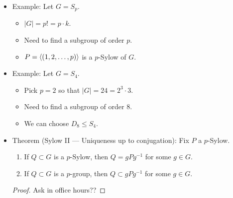 \documentclass[../notes.tex]{subfiles}
\begin{document}
\begin{itemize}
\begin{proof}
\begin{equation*}
            |\Orb(S)| = \frac{|G|}{|\Stab(S)|}
            = \frac{p^n\cdot k}{p^m\cdots}
            = p^{n-m}\cdots
        \end{equation*}
        i.e., that $|\Orb(S)|$ has at least one power of $p$ in its prime factorization. This implies that $|\Orb(S)|\equiv 0\mod p$. But since $|\Orb(S)|$ is divisible by $p$ for all $S$, $|X|$ must be, too (why??). However,
        \begin{equation*}
            |X| = \binom{p^nk}{p^n}
            = \frac{(p^nk)!}{(p^nk-p^n)!p^n!}
            = \frac{(p^nk)(p^nk-1)\cdots(p^nk-p^n+1)}{(p^n)(p^n-1)\cdots 1}
            = \frac{p^nk}{p^n}\cdots\frac{p^nk-(p^n-1)}{p^n-(p^n-1)}
        \end{equation*}
        We show that every power of $p$ in the numerator above cancels with one in the denominator. In fact, we can do this term-by-term. Consider $p^nk-i$ and $p^n-i$ for some $i=0,\dots,p^n-1$. Let $p^j$ be the largest power of $p$ dividing $i$. Note that since $i<p^n$, we must have $j<n$. Thus, $p^j$ will divide $p^nk$ and $p^n$, too, and hence the differences $p^nk-i$ and $p^n-i$ as well. This implies the desired result. Therefore, since there are no "excess" powers of $p$ in the numerator above, $|X|$ is \emph{not} divisible by $p$, a contradiction.
    \end{proof}
    \item Example: Let $G=S_p$.
    \begin{itemize}
        \item $|G|=p!=p\cdot k$.
        \item Need to find a subgroup of order $p$.
        \item $P=\left\langle{(1,2,\dots,p)}\right\rangle$ is a $p$-Sylow of $G$.
    \end{itemize}
    \item Example: Let $G=S_4$.
    \begin{itemize}
        \item Pick $p=2$ so that $|G|=24=2^3\cdot 3$.
        \item Need to find a subgroup of order 8.
        \item We can choose $D_8\leq S_4$.
    \end{itemize}
    \item Theorem (Sylow II --- Uniqueness up to conjugation): Fix $P$ a $p$-Sylow.
    \begin{enumerate}
        \item If $Q\subset G$ is a $p$-Sylow, then $Q=gPg^{-1}$ for some $g\in G$.
        \item If $Q\subset G$ is a $p$-group, then $Q\subset gPg^{-1}$ for some $g\in G$.
    \end{enumerate}
    \begin{proof}
        Ask in office hours??
    \end{proof}
\end{itemize}
\end{document}
